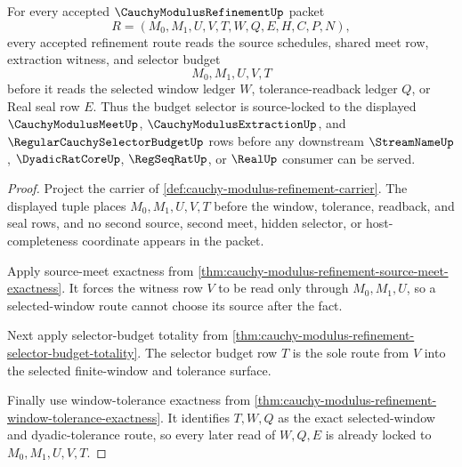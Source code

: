 \begin{theorem}
\label{thm:cauchy-modulus-refinement-budget-selector-source-lock}
For every accepted $\CauchyModulusRefinementUp$ packet
$$
R=(M_0,M_1,U,V,T,W,Q,E,H,C,P,N),
$$
every accepted refinement route reads the source schedules, shared meet row, extraction witness, and selector budget
$$
M_0,M_1,U,V,T
$$
before it reads the selected window ledger $W$, tolerance-readback ledger $Q$, or Real seal row $E$. Thus the budget selector is source-locked to the displayed $\CauchyModulusMeetUp$, $\CauchyModulusExtractionUp$, and $\RegularCauchySelectorBudgetUp$ rows before any downstream $\StreamNameUp$, $\DyadicRatCoreUp$, $\RegSeqRatUp$, or $\RealUp$ consumer can be served.
\end{theorem}
\begin{proof}
Project the carrier of \autoref{def:cauchy-modulus-refinement-carrier}. The displayed tuple places $M_0,M_1,U,V,T$ before the window, tolerance, readback, and seal rows, and no second source, second meet, hidden selector, or host-completeness coordinate appears in the packet.

Apply source-meet exactness from \autoref{thm:cauchy-modulus-refinement-source-meet-exactness}. It forces the witness row $V$ to be read only through $M_0,M_1,U$, so a selected-window route cannot choose its source after the fact.

Next apply selector-budget totality from \autoref{thm:cauchy-modulus-refinement-selector-budget-totality}. The selector budget row $T$ is the sole route from $V$ into the selected finite-window and tolerance surface.

Finally use window-tolerance exactness from \autoref{thm:cauchy-modulus-refinement-window-tolerance-exactness}. It identifies $T,W,Q$ as the exact selected-window and dyadic-tolerance route, so every later read of $W,Q,E$ is already locked to $M_0,M_1,U,V,T$.
\end{proof}

